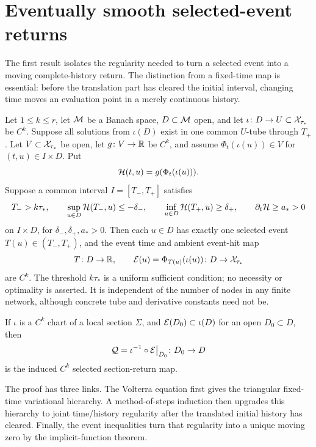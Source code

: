 \section{Eventually smooth selected-event returns}\label{sec:eventual-return}

The first result isolates the regularity needed to turn a selected event into
a moving complete-history return.  The distinction from a fixed-time map is
essential: before the translation part has cleared the initial interval,
changing time moves an evaluation point in a merely continuous history.

\begin{theorem}
\label{thm:eventual-selected-return}
Let \(1\le k\le r\), let \(\mathcal M\) be a Banach space,
\(D\subset\mathcal M\) open, and let
\(\iota\colon D\to U\subset\mathcal X_{\tau_*}\) be \(C^k\).  Suppose all
solutions from \(\iota(D)\) exist in one common \(U\)-tube through \(T_+\).
Let \(V\subset\mathcal X_{\tau_*}\) be open, let
\(g\colon V\to\mathbb R\) be \(C^k\), and assume
\(\Phi_t(\iota(u))\in V\) for \((t,u)\in I\times D\).  Put
\[
 \mathcal H(t,u)=g(\Phi_t(\iota(u))).
\]
Suppose a common interval \(I=[T_-,T_+]\) satisfies
\begin{equation}
 T_->k\tau_*,\qquad
 \sup_{u\in D}\mathcal H(T_-,u)\le-\delta_-,\qquad
 \inf_{u\in D}\mathcal H(T_+,u)\ge\delta_+,
 \qquad
 \partial_t\mathcal H\ge a_*>0                             \label{eq:eventual-return-gates}
\end{equation}
on \(I\times D\), for \(\delta_-,\delta_+,a_*>0\).  Then each
\(u\in D\) has exactly one selected event
\(T(u)\in(T_-,T_+)\), and the event time and ambient event-hit map
\[
 T\colon D\to\mathbb R,
 \qquad \mathcal E(u)=\Phi_{T(u)}(\iota(u))
       \colon D\to\mathcal X_{\tau_*}
\]
are \(C^k\).  The threshold \(k\tau_*\) is a uniform sufficient condition;
no necessity or optimality is asserted.  It is independent of the number of
nodes in any finite network, although concrete tube and derivative constants
need not be.

If \(\iota\) is a \(C^k\) chart of a local section \(\Sigma\), and
\(\mathcal E(D_0)\subset\iota(D)\) for an open \(D_0\subset D\), then
\begin{equation}
 \mathcal Q=\iota^{-1}\circ\mathcal E\big|_{D_0}
 \colon D_0\to D                                      \label{eq:induced-selected-return}
\end{equation}
is the induced \(C^k\) selected section-return map.
\end{theorem}

The proof has three links.  The Volterra equation first gives the triangular
fixed-time variational hierarchy.  A method-of-steps induction then upgrades
this hierarchy to joint time/history regularity after the translated initial
history has cleared.  Finally, the event inequalities turn that regularity
into a unique moving zero by the implicit-function theorem.

